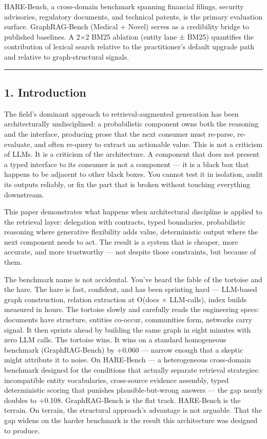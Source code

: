 \documentclass[
]{article}
\begin{document}
HARE-Bench, a cross-domain benchmark spanning financial filings,
security advisories, regulatory documents, and technical patents, is the
primary evaluation surface. GraphRAG-Bench (Medical + Novel) serves as a
credibility bridge to published baselines. A 2×2 BM25 ablation (entity
lane ± BM25) quantifies the contribution of lexical search relative to
the practitioner's default upgrade path and relative to graph-structural
signals.

\begin{center}\rule{0.5\linewidth}{0.5pt}\end{center}

\subsection{1. Introduction}\label{introduction}

The field's dominant approach to retrieval-augmented generation has been
architecturally undisciplined: a probabilistic component owns both the
reasoning and the interface, producing prose that the next consumer must
re-parse, re-evaluate, and often re-query to extract an actionable
value. This is not a criticism of LLMs. It is a criticism of the
architecture. A component that does not present a typed interface to its
consumer is not a component --- it is a black box that happens to be
adjacent to other black boxes. You cannot test it in isolation, audit
its outputs reliably, or fix the part that is broken without touching
everything downstream.

This paper demonstrates what happens when architectural discipline is
applied to the retrieval layer: delegation with contracts, typed
boundaries, probabilistic reasoning where generative flexibility adds
value, deterministic output where the next component needs to act. The
result is a system that is cheaper, more accurate, and more trustworthy
--- not despite those constraints, but because of them.

The benchmark name is not accidental. You've heard the fable of the
tortoise and the hare. The hare is fast, confident, and has been
sprinting hard --- LLM-based graph construction, relation extraction at
O(docs × LLM-calls), index builds measured in hours. The tortoise slowly
and carefully reads the engineering specs: documents have structure,
entities co-occur, communities form, networks carry signal. It then
sprints ahead by building the same graph in eight minutes with zero LLM
calls. The tortoise wins. It wins on a standard homogeneous benchmark
(GraphRAG-Bench) by +0.060 --- narrow enough that a skeptic might
attribute it to noise. On HARE-Bench --- a heterogeneous cross-domain
benchmark designed for the conditions that actually separate retrieval
strategies: incompatible entity vocabularies, cross-source evidence
assembly, typed deterministic scoring that punishes plausible-but-wrong
answers --- the gap nearly doubles to +0.108. GraphRAG-Bench is the flat
track. HARE-Bench is the terrain. On terrain, the structural approach's
advantage is not arguable. That the gap widens on the harder benchmark
is the result this architecture was designed to produce.
\end{document}
